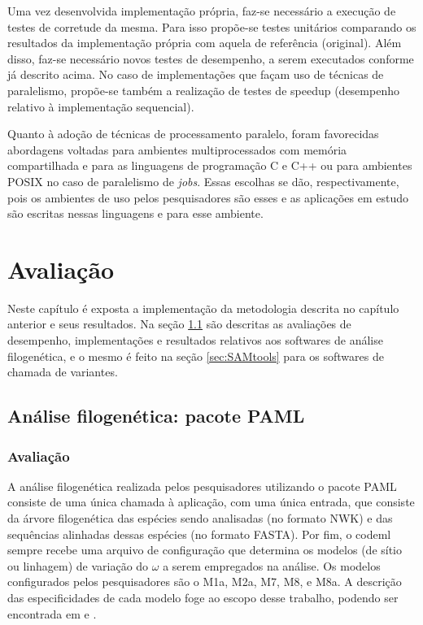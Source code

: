 \documentclass[cic,tc]{iiufrgs}
\begin{document}
Uma vez desenvolvida implementação própria, faz-se necessário a execução de
testes de corretude da mesma. Para isso propõe-se testes unitários comparando
os resultados da implementação própria com aquela de referência (original).
Além disso, faz-se necessário novos testes de desempenho, a serem executados
conforme já descrito acima. No caso de implementações que façam uso de técnicas
de paralelismo, propõe-se também a realização de testes de speedup (desempenho
relativo à implementação sequencial).

Quanto à adoção de técnicas de processamento paralelo, foram favorecidas
abordagens voltadas para ambientes multiprocessados com memória compartilhada e
para as linguagens de programação C e C++ ou para ambientes POSIX no caso de
paralelismo de \textit{jobs}. Essas escolhas se dão, respectivamente, pois os
ambientes de uso pelos pesquisadores são esses e as aplicações em estudo são
escritas nessas linguagens e para esse ambiente.

%
%
%
%
\chapter{Avaliação}
\label{chap:imp}

Neste capítulo é exposta a implementação da metodologia descrita no capítulo
anterior e seus resultados. Na seção \ref{sec:filomp} são descritas as avaliações de
desempenho, implementações e resultados relativos aos softwares de análise
filogenética, e o mesmo é feito na seção \ref{sec:SAMtools} para os softwares de
chamada de variantes.

\section{Análise filogenética: pacote PAML}
\label{sec:filomp}

\subsection{Avaliação}

A análise filogenética realizada pelos pesquisadores utilizando o pacote PAML
consiste de uma única chamada à aplicação, com uma única entrada, que consiste
da árvore filogenética das espécies sendo analisadas (no formato NWK) e das
sequências alinhadas dessas espécies (no formato FASTA). Por fim, o codeml
sempre recebe uma arquivo de configuração que determina os modelos (de sítio ou
linhagem) de variação do $\omega$ a serem empregados na análise. Os modelos
configurados pelos pesquisadores são o M1a, M2a, M7, M8, e M8a. A descrição das
especificidades de cada modelo foge ao escopo desse trabalho, podendo ser
encontrada em \cite{yang2000codon} e \cite{zhang2005evaluation}.
\end{document}
